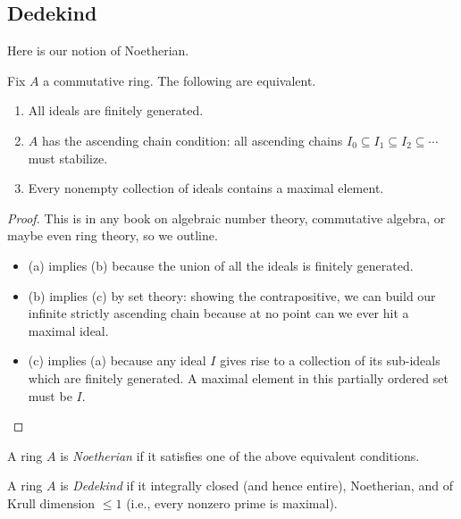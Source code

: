 \subsection{Dedekind}
Here is our notion of Noetherian.
\begin{prop}
    Fix $A$ a commutative ring. The following are equivalent.
    \begin{enumerate}[label=(\alph*)]
        \item All ideals are finitely generated.
        \item $A$ has the ascending chain condition: all ascending chains $I_0\subseteq I_1\subseteq I_2\subseteq\cdots$ must stabilize.
        \item Every nonempty collection of ideals contains a maximal element.
    \end{enumerate}
\end{prop}
\begin{proof}
     This is in any book on algebraic number theory, commutative algebra, or maybe even ring theory, so we outline.
     \begin{itemize}
         \item (a) implies (b) because the union of all the ideals is finitely generated.
         \item (b) implies (c) by set theory: showing the contrapositive, we can build our infinite strictly ascending chain because at no point can we ever hit a maximal ideal.
         \item (c) implies (a) because any ideal $I$ gives rise to a collection of its sub-ideals which are finitely generated. A maximal element in this partially ordered set must be $I.$
         \qedhere
     \end{itemize}
\end{proof}
\begin{defi}[Noetherian]
    A ring $A$ is \textit{Noetherian} if it satisfies one of the above equivalent conditions.
\end{defi}
\begin{defi}[Dedekind]
    A ring $A$ is \textit{Dedekind} if it integrally closed (and hence entire), Noetherian, and of Krull dimension $\le1$ (i.e., every nonzero prime is maximal).
\end{defi}